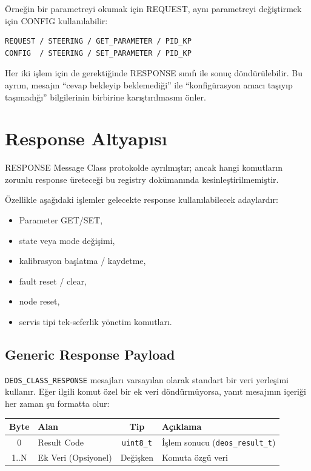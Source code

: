 \documentclass[a4paper,10pt]{article}
\newcommand{\code}[1]{\texttt{#1}}
\begin{document}
Örneğin bir parametreyi okumak için REQUEST, aynı parametreyi değiştirmek için CONFIG
kullanılabilir:

\begin{verbatim}
REQUEST / STEERING / GET_PARAMETER / PID_KP
CONFIG  / STEERING / SET_PARAMETER / PID_KP
\end{verbatim}

Her iki işlem için de gerektiğinde RESPONSE sınıfı ile sonuç döndürülebilir. Bu ayrım,
mesajın ``cevap bekleyip beklemediği'' ile ``konfigürasyon amacı taşıyıp taşımadığı''
bilgilerinin birbirine karıştırılmasını önler.

\section{Response Altyapısı}

RESPONSE Message Class protokolde ayrılmıştır; ancak hangi komutların zorunlu response
üreteceği bu registry dokümanında kesinleştirilmemiştir.

Özellikle aşağıdaki işlemler gelecekte response kullanılabilecek adaylardır:
\begin{itemize}[nosep]
    \item Parameter GET/SET,
    \item state veya mode değişimi,
    \item kalibrasyon başlatma / kaydetme,
    \item fault reset / clear,
    \item node reset,
    \item servis tipi tek-seferlik yönetim komutları.
\end{itemize}

\subsection{Generic Response Payload}

\code{DEOS\_CLASS\_RESPONSE} mesajları varsayılan olarak standart bir veri yerleşimi kullanır. Eğer ilgili komut özel bir ek veri döndürmüyorsa, yanıt mesajının içeriği her zaman şu formatta olur:

\begin{center}
\begin{tabularx}{\textwidth}{c l c X}
\toprule
Byte & Alan & Tip & Açıklama \\
\midrule
0 & Result Code & \code{uint8\_t} & İşlem sonucu (\code{deos\_result\_t}) \\
1..N & Ek Veri (Opsiyonel) & Değişken & Komuta özgü veri \\
\bottomrule
\end{tabularx}
\end{center}
\end{document}
